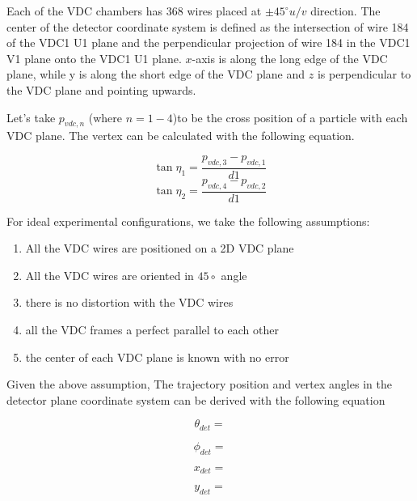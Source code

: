 Each of the VDC chambers has 368 wires placed at $\pm 45 ^{\circ} u/v$ direction. The center of the detector coordinate system is defined as the intersection of wire 184 of the VDC1 U1 plane and the perpendicular projection of wire 184 in the VDC1 V1 plane onto the VDC1 U1 plane. $x$-axis is along the long edge of the VDC plane, while y is along the short edge of the VDC plane and $z$ is perpendicular to the VDC plane and pointing upwards. 

Let's take $p_{vdc,n}$ (where ${n=1-4}$)to be the cross position of a particle with each VDC plane. The vertex can be calculated with the following equation. 

\begin{equation}
    \tan \eta_{1} = \frac{p_{vdc,3} - p_{vdc, 1}}{d1}    
\end{equation}
\begin{equation}
    \tan \eta_{2} = \frac{p_{vdc,4} - p_{vdc, 2}}{d1}    
\end{equation}

For ideal experimental configurations, we take the following assumptions:
\begin{enumerate}
    \item All the VDC wires are positioned on a 2D VDC plane
    \item All the VDC wires are oriented in $45\circ$ angle
    \item there is no distortion with the VDC wires
    \item all the VDC frames a perfect parallel to each other 
    \item the center of each VDC plane is known with no error
\end{enumerate}

Given the above assumption, The trajectory position and vertex angles in the detector plane coordinate system can be derived with the following equation 

\begin{equation}
    \theta_{det} = 
\end{equation}
    
\begin{equation}
    \phi_{det} = 
\end{equation}

\begin{equation}
    x_{det} =
\end{equation}

\begin{equation}
    y_{det} =
\end{equation}

